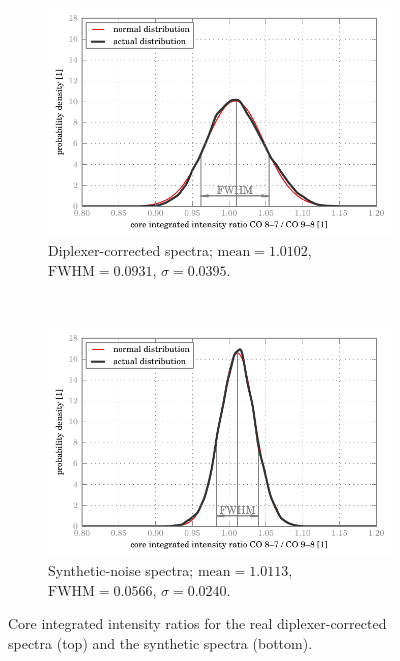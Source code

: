 \begin{figure}
    \centering
    \begin{subfigure}[0]{\textwidth}
        \centering
        \includegraphics[width=\textwidth]{ratios_core_corrected}
        \caption{Diplexer-corrected spectra;
        $\text{mean}=1.0102$, $\text{FWHM}=0.0931$, $\sigma=0.0395$.}
    \end{subfigure}
    \\
    \begin{subfigure}[0]{\textwidth}
        \centering
        \includegraphics[width=\textwidth]{ratios_core_noisy}
        \caption{Synthetic-noise spectra;
        $\text{mean}=1.0113$, $\text{FWHM}=0.0566$, $\sigma=0.0240$.}
    \end{subfigure}
    \caption{
        Core integrated intensity ratios for the real diplexer-corrected spectra (top)
        and the synthetic spectra (bottom).
    }
    \label{fig:ratio_core}
\end{figure}

